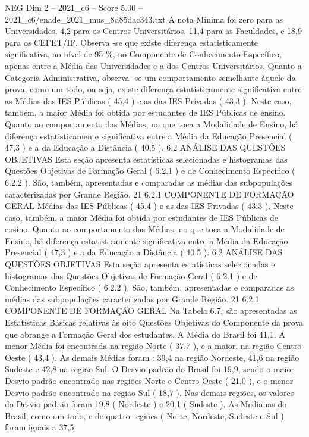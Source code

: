 \begin{textsample}{NEG Dim 2 – 2021\_c6 – Score 5.00 – 2021\_c6/enade\_2021\_mus\_8d85dac343.txt}
A nota Mínima foi zero para as Universidades, 4,2 para os Centros Universitários, 11,4 para as Faculdades, e 18,9 para os CEFET/IF.
Observa -se que existe diferença estatisticamente significativa, ao nível de 95 \%, no Componente de Conhecimento Específico, apenas entre a Média das Universidades e a dos Centros Universitários.
Quanto a Categoria Administrativa, observa -se um comportamento semelhante àquele da prova, como um todo, ou seja, existe diferença estatisticamente significativa entre as Médias das IES Públicas ( 45,4 ) e as das IES Privadas ( 43,3 ).
Neste caso, também, a maior Média foi obtida por estudantes de IES Públicas de ensino.
Quanto ao comportamento das Médias, no que toca a Modalidade de Ensino, há diferença estatisticamente significativa entre a Média da Educação Presencial ( 47,3 ) e a da Educação a Distância ( 40,5 ). 6.2 ANÁLISE DAS QUESTÕES OBJETIVAS Esta seção apresenta estatísticas selecionadas e histogramas das Questões Objetivas de Formação Geral ( 6.2.1 ) e de Conhecimento Específico ( 6.2.2 ).
São, também, apresentadas e comparadas as médias das subpopulações caracterizadas por Grande Região. 21 6.2.1 COMPONENTE DE FORMAÇÃO GERAL Médias das IES Públicas ( 45,4 ) e as das IES Privadas ( 43,3 ).
Neste caso, também, a maior Média foi obtida por estudantes de IES Públicas de ensino.
Quanto ao comportamento das Médias, no que toca a Modalidade de Ensino, há diferença estatisticamente significativa entre a Média da Educação Presencial ( 47,3 ) e a da Educação a Distância ( 40,5 ). 6.2 ANÁLISE DAS QUESTÕES OBJETIVAS Esta seção apresenta estatísticas selecionadas e histogramas das Questões Objetivas de Formação Geral ( 6.2.1 ) e de Conhecimento Específico ( 6.2.2 ).
São, também, apresentadas e comparadas as médias das subpopulações caracterizadas por Grande Região. 21 6.2.1 COMPONENTE DE FORMAÇÃO GERAL Na Tabela 6.7, são apresentadas as Estatísticas Básicas relativas às oito Questões Objetivas do Componente da prova que abrange a Formação Geral dos estudantes.
A Média do Brasil foi 41,1.
A menor Média foi encontrada na região Norte ( 37,7 ), e a maior, na região Centro-Oeste ( 43,4 ).
As demais Médias foram : 39,4 na região Nordeste, 41,6 na região Sudeste e 42,8 na região Sul.
O Desvio padrão do Brasil foi 19,9, sendo o maior Desvio padrão encontrado nas regiões Norte e Centro-Oeste ( 21,0 ), e o menor Desvio padrão encontrado na região Sul ( 18,7 ).
Nas demais regiões, os valores do Desvio padrão foram 19,8 ( Nordeste ) e 20,1 ( Sudeste ).
As Medianas do Brasil, como um todo, e de quatro regiões ( Norte, Nordeste, Sudeste e Sul ) foram iguais a 37,5.

\end{textsample}
